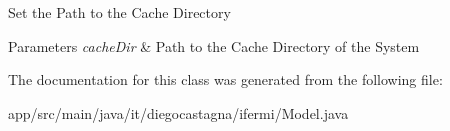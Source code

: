 Set the Path to the Cache Directory 
\begin{DoxyParams}{Parameters}
{\em cache\+Dir} & Path to the Cache Directory of the System \\
\hline
\end{DoxyParams}


The documentation for this class was generated from the following file\+:\begin{DoxyCompactItemize}
\item 
app/src/main/java/it/diegocastagna/ifermi/Model.\+java\end{DoxyCompactItemize}
